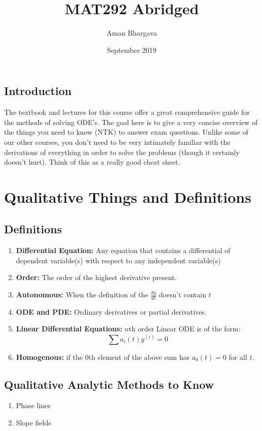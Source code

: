\documentclass[a4paper,12pt]{report}
\begin{document}
\title{MAT292 Abridged}
\author{Aman Bhargava}
\date{September 2019}
\maketitle

\tableofcontents

\section{Introduction}
The textbook and lectures for this course offer a great comprehensive guide for the 
methods of solving ODE's. The goal here is to give a very concise overview of the things you 
need to know (NTK) to answer exam questions. Unlike
some of our other courses, you don't need to be very intimately familiar with the derivations
of everything in order to solve the problems (though it certainly doesn't hurt). Think of this 
as a really good cheat sheet.

\chapter{Qualitative Things and Definitions}
\section{Definitions}
\begin{enumerate}
\item \textbf{Differential Equation: } Any equation that contains a differential of dependent variable(s) with respect to any independent variable(s)
\item \textbf{Order: } The order of the highest derivative present.
\item \textbf{Autonomous: } When the definition of the $\frac{dy}{dt}$ doesn't contain $t$
\item \textbf{ODE and PDE: } Ordinary derivatives or partial derivatives. 
\item \textbf{Linear Differential Equations: } $n$th order Linear ODE is of the form: $$\sum a_i(t)y^{(i)} = 0$$
\item \textbf{Homogenous: } if the $0$th element of the above sum has $a_0(t) = 0$ for all $t$. 
\end{enumerate}


\section{Qualitative Analytic Methods to Know}
\begin{enumerate}
\item Phase lines
\item Slope fields
\end{enumerate}
\end{document}
